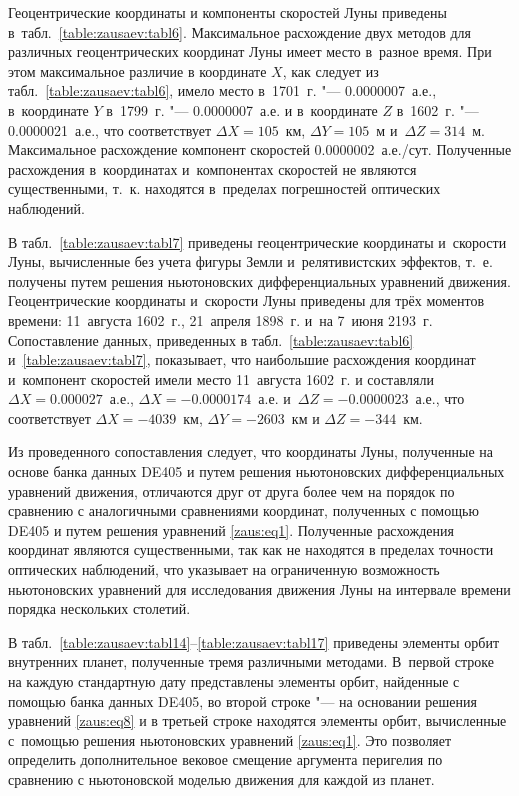 Геоцентрические координаты и компоненты скоростей Луны приведены в~табл.~\ref{table:zausaev:tabl6}. 
Максимальное расхождение двух методов для различных геоцентрических координат Луны имеет место в~разное время. 
При этом максимальное различие в координате $X$, как следует из табл.~\ref{table:zausaev:tabl6},  имело место в~1701~г. "--- 0.0000007~а.е., в~координате $Y$ в~1799~г. "--- 0.0000007~а.е. и в~координате $Z$ в~1602~г. "--- 0.0000021~а.е., 
что соответствует $\Delta X=105$~км, $\Delta Y=105$~м и~$\Delta Z=314$~м. 
Максимальное расхождение компонент скоростей 0.0000002~а.е./сут. 
Полученные расхождения в~координатах и~компонентах скоростей не являются существенными, т.~к. находятся в~пределах погрешностей оптических наблюдений.

В табл.~\ref{table:zausaev:tabl7} приведены геоцентрические координаты и~скорости Луны, вычисленные без учета фигуры Земли и~релятивистских эффектов, т.~е. получены путем решения ньютоновских дифференциальных уравнений движения. 
Геоцентрические координаты и~скорости Луны приведены для трёх моментов времени: 11~августа 1602~г., 21~апреля 1898~г. и~на 7~июня 2193~г. 
Сопоставление данных, приведенных в табл.~\ref{table:zausaev:tabl6}  и~\ref{table:zausaev:tabl7}, показывает, что наибольшие расхождения координат и~компонент скоростей имели место 11~августа 1602~г. и составляли $\Delta X=0.000027$~а.е., $\Delta X=-0.0000174$~а.е. и~$\Delta Z=-0.0000023$~а.е., что соответствует $\Delta X=-4039$~км, $\Delta Y=-2603$~км и $\Delta Z=-344$~км.



Из проведенного сопоставления следует, что координаты Луны, полученные на основе банка данных DE405 и путем решения ньютоновских дифференциальных уравнений движения, отличаются друг от друга  более чем на порядок по сравнению с аналогичными сравнениями координат, полученных с помощью DE405 и путем решения уравнений \eqref{zaus:eq1}. 
Полученные расхождения координат являются существенными, так как не находятся в пределах точности оптических наблюдений, что указывает на ограниченную возможность ньютоновских уравнений для исследования движения Луны на интервале времени порядка нескольких столетий.

В табл.~\ref{table:zausaev:tabl14}--\ref{table:zausaev:tabl17} приведены элементы орбит внутренних планет, полученные тремя различными методами. 
В~первой строке на каждую стандартную дату представлены элементы орбит, найденные с помощью банка данных DE405, во второй строке "--- на основании решения уравнений  \eqref{zaus:eq8}  и в третьей строке находятся элементы орбит, вычисленные с~помощью решения ньютоновских уравнений \eqref{zaus:eq1}. 
Это позволяет определить дополнительное вековое смещение аргумента перигелия по сравнению с ньютоновской моделью движения для каждой из планет.

